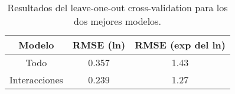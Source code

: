 \begin{table}[H]
\centering
\caption{Resultados del leave-one-out cross-validation para los dos mejores modelos.} 
\label{Tab:loocv}
\begin{tabular}{ccc}
  \hline
Modelo & RMSE (ln) & RMSE (exp del ln) \\ 
  \hline
Todo & 0.357 & 1.43 \\ 
  Interacciones & 0.239 & 1.27 \\ 
   \hline
\end{tabular}
\end{table}

